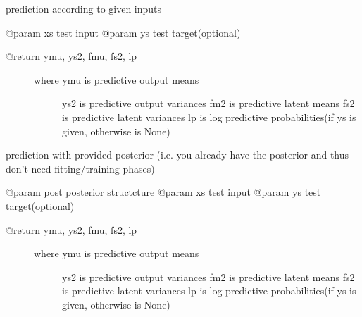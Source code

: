 \documentclass[letterpaper,10pt,english]{sphinxmanual}
\begin{document}
\begin{fulllineitems}

\begin{fulllineitems}
\label{pyGPs.Core:pyGPs.Core.gp.GP.predict}
prediction according to given inputs

@param xs           test input
@param ys           test target(optional)
\begin{description}
\item[{@return ymu, ys2, fmu, fs2, lp}] \leavevmode\begin{description}
\item[{where ymu is predictive output means}] \leavevmode
ys2 is predictive output variances
fm2 is predictive latent means
fs2 is predictive latent variances
lp  is log predictive probabilities(if ys is given, otherwise is None)

\end{description}

\end{description}

\end{fulllineitems}


\begin{fulllineitems}
\label{pyGPs.Core:pyGPs.Core.gp.GP.predict_with_posterior}
prediction with provided posterior
(i.e. you already have the posterior and thus don't need fitting/training phases)

@param post         posterior structcture
@param xs           test input
@param ys           test target(optional)
\begin{description}
\item[{@return ymu, ys2, fmu, fs2, lp}] \leavevmode\begin{description}
\item[{where ymu is predictive output means}] \leavevmode
ys2 is predictive output variances
fm2 is predictive latent means
fs2 is predictive latent variances
lp  is log predictive probabilities(if ys is given, otherwise is None)

\end{description}

\end{description}

\end{fulllineitems}


\end{fulllineitems}
\end{document}
